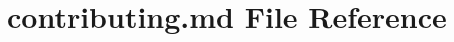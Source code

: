 \hypertarget{contributing_8md}{}\section{contributing.\+md File Reference}
\label{contributing_8md}
